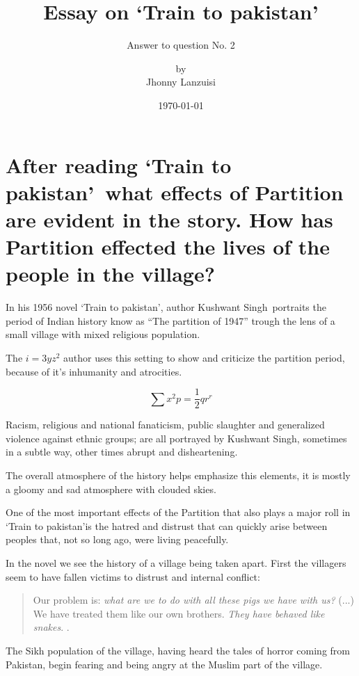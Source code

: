\documentclass{scrartcl}
\begin{document}
%
%
\newcommand{\tpak}{`Train to pakistan'}
\newcommand{\ks}{Kushwant Singh}
\title{Essay on \tpak}
\subtitle{Answer to question No. 2}
\subject{IDE 143---El mundo de la literatura en inglés}
\titlehead{Universidad Simón Bolívar\hfill Caracas, Venezuela}
\author{by \\ Jhonny Lanzuisi}
\date{\today}
\maketitle

\section*{After reading \tpak\ what effects of Partition are evident in the story. How has Partition effected the lives of the people in the village?}
\label{sec:question}

In his 1956 novel \tpak \cite{khushwant_singh_train_1990},
author \ks\ portraits the period of Indian history know
as ``The partition of 1947'' trough the lens of a small village
with mixed religious population.

The \( i = 3yz^2\) author uses this setting to show and criticize
the partition period, because of it's inhumanity and
atrocities.

\[ \sum x^2 p = \frac12 qr^r\]

Racism, religious and national fanaticism,
public slaughter and generalized violence against ethnic groups;
are all portrayed by \ks, sometimes in a subtle way,
other times abrupt and disheartening.

The overall atmosphere of the history
helps emphasize this elements,
it is mostly a gloomy and sad atmosphere
with clouded skies.

One of the most important effects of the Partition
that also plays a major roll in \tpak is
the hatred and distrust that can quickly arise
between peoples that, not so long ago,
were living peacefully.

In the novel we see the history of a village
being taken apart.
First the villagers seem to have fallen victims
to distrust and internal conflict:
\begin{quote}
  Our problem is: \emph{what are we to do with all
    these pigs we have with us?} (...) We have treated them
  like our own brothers. \emph{They have behaved like snakes}.
  \cite[p. 171, para. 6, emphasis added by me]{khushwant_singh_train_1990}.
\end{quote}
The Sikh population of the village,
having heard the tales of horror coming from Pakistan,
begin fearing and being angry at the Muslim part of the village.
\end{document}
